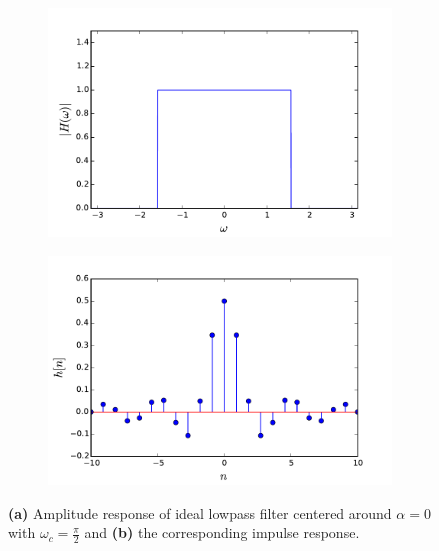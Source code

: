 \begin{figure}[H]
\begin{subfigure}[b]{0.50\textwidth}
        \centering
\includegraphics[scale=0.45]{figures/filter_teori/ideal_low2.pdf}
\caption{}
\end{subfigure}
\begin{subfigure}[b]{0.50\textwidth}
        \centering  
\includegraphics[scale=0.45]{figures/filter_teori/ideal_low1.pdf}
\caption{}
 \end{subfigure}
\caption{\textbf{(a)} Amplitude response of ideal lowpass filter centered around $\alpha=0$ with $\omega_c = \frac{\pi}{2}$ and \textbf{(b)} the corresponding impulse response.}
\label{fig:ideal_low}
\end{figure}

